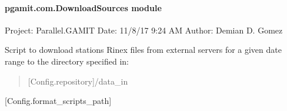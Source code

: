 \documentclass[letterpaper,10pt,english]{sphinxmanual}
\begin{document}
\paragraph{pgamit.com.DownloadSources module}
\label{\detokenize{pgamit.com:module-pgamit.com.DownloadSources}}\label{\detokenize{pgamit.com:pgamit-com-downloadsources-module}}
\sphinxAtStartPar
Project: Parallel.GAMIT
Date: 11/8/17 9:24 AM
Author: Demian D. Gomez

\sphinxAtStartPar
Script to download stations Rinex files from external servers for a given date range
to the directory specified in:
\begin{quote}

\sphinxAtStartPar
{[}Config.repository{]}/data\_in
\end{quote}
\begin{description}
\sphinxAtStartPar
{[}Config.format\_scripts\_path{]}

\end{description}
\end{document}
